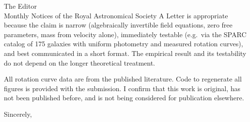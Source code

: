 \documentclass[11pt]{letter}
\begin{document}
\begin{letter}{The Editor\\Monthly Notices of the Royal Astronomical Society}
A Letter is appropriate because the claim is narrow (algebraically invertible field equations, zero free parameters, mass from velocity alone), immediately testable (e.g.\ via the SPARC catalog of 175 galaxies with uniform photometry and measured rotation curves), and best communicated in a short format. The empirical result and its testability do not depend on the longer theoretical treatment.

All rotation curve data are from the published literature. Code to regenerate all figures is provided with the submission. I confirm that this work is original, has not been published before, and is not being considered for publication elsewhere.

\closing{Sincerely,}

\end{letter}
\end{document}
